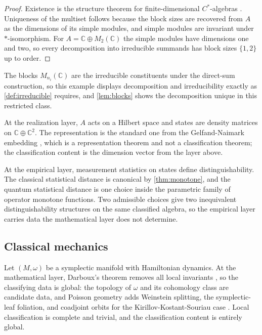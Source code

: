 \documentclass[11pt,letterpaper]{article}
\theoremstyle{definition}
\begin{document}
\begin{proof}
Existence is the structure theorem for finite-dimensional $C^*$-algebras \cite{corpus-9}. Uniqueness of the multiset follows because the block sizes are recovered from $A$ as the dimensions of its simple modules, and simple modules are invariant under $*$-isomorphism. For $A = \mathbb{C} \oplus M_2(\mathbb{C})$ the simple modules have dimensions one and two, so every decomposition into irreducible summands has block sizes $\{1, 2\}$ up to order.
\end{proof}

The blocks $M_{n_i}(\mathbb{C})$ are the irreducible constituents under the direct-sum construction, so this example displays decomposition and irreducibility exactly as \cref{def:irreducible} requires, and \cref{lem:blocks} shows the decomposition unique in this restricted class.

At the realization layer, $A$ acts on a Hilbert space and states are density matrices on $\mathbb{C} \oplus \mathbb{C}^2$. The representation is the standard one from the Gelfand-Naimark embedding \cite{corpus-42}, which is a representation theorem and not a classification theorem; the classification content is the dimension vector from the layer above.

At the empirical layer, measurement statistics on states define distinguishability. The classical statistical distance is canonical by \cref{thm:monotone}, and the quantum statistical distance is one choice inside the parametric family of operator monotone functions. Two admissible choices give two inequivalent distinguishability structures on the same classified algebra, so the empirical layer carries data the mathematical layer does not determine.

\subsection{Classical mechanics}

Let $(M, \omega)$ be a symplectic manifold with Hamiltonian dynamics. At the mathematical layer, Darboux's theorem removes all local invariants \cite{corpus-6}, so the classifying data is global: the topology of $\omega$ and its cohomology class are candidate data, and Poisson geometry adds Weinstein splitting, the symplectic-leaf foliation, and coadjoint orbits for the Kirillov-Kostant-Souriau case \cite{corpus-7,corpus-68}. Local classification is complete and trivial, and the classification content is entirely global.
\end{document}
